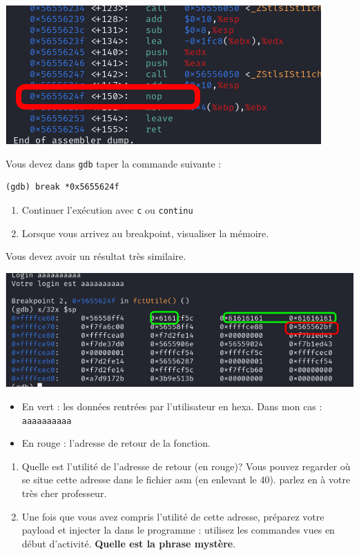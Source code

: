\documentclass[french, 12pt]{article}%
\newcommand{\itemE}{\item[$\bullet$]}
\begin{document}
\begin{center}
\includegraphics[scale=0.7]{./ressource/ex2_asm_break}
\end{center}

Vous devez dans \verb?gdb? taper la commande suivante :

\begin{lstlisting}[style=commande]
(gdb) break *0x5655624f
\end{lstlisting}



\begin{enumerate}[resume]
\item Continuer l'exécution avec \verb?c? ou \verb?continu?
\item Lorsque vous arrivez au breakpoint, visualiser la mémoire. 
\end{enumerate}

Vous devez avoir un résultat très similaire. 
\begin{center}
\includegraphics[scale=0.7]{./ressource/dump_mem}
\end{center}

\begin{itemize}
\itemE En vert : les données rentrées par l'utilisateur en hexa. Dans mon cas : \verb?aaaaaaaaaa?
\itemE En rouge : l'adresse de retour de la fonction.
\end{itemize}


\begin{enumerate}[resume]
\item Quelle est l'utilité de l'adresse de retour  (en rouge)? Vous pouvez regarder où se situe cette adresse dans le fichier asm (en enlevant le 40). parlez en à votre très cher professeur.

\item Une fois que vous avez compris l'utilité de cette adresse, préparez votre payload et injecter la dans le programme : utilisez les commandes vues en début d'activité. \textbf{Quelle est la phrase mystère}.
\end{enumerate}
\end{document}
